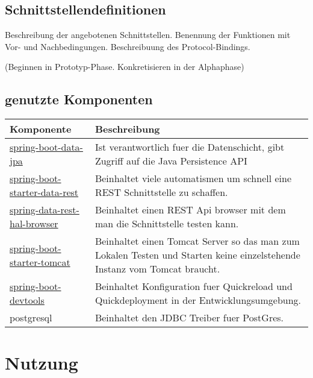 \subsection{Schnittstellendefinitionen}
Beschreibung der angebotenen Schnittstellen. Benennung der Funktionen
mit Vor- und Nachbedingungen. Beschreibuung des Protocol-Bindings.

(Beginnen in Prototyp-Phase. Konkretisieren in der Alphaphase)

\subsection{genutzte Komponenten}

\begin{table}[h]
\begin{tabular}{|l|p{4cm}|}
   \hline 
   Komponente & Beschreibung \\
   \hline
   \href{https://docs.spring.io/spring-data/jpa/docs/current/reference/html/}{spring-boot-data-jpa} &
    Ist verantwortlich fuer die Datenschicht, gibt Zugriff auf die Java Persistence API
   \\ \hline
   \href{https://docs.spring.io/spring-data/rest/docs/current/reference/html/}{spring-boot-starter-data-rest} &
   Beinhaltet viele automatismen um schnell eine REST Schnittstelle zu schaffen.
   \\ \hline
   \href{https://docs.spring.io/spring-data/rest/docs/current/reference/html/#_the_hal_browser}{spring-data-rest-hal-browser} &
   Beinhaltet einen REST Api browser mit dem man die Schnittstelle testen kann.
   \\ \hline
   \href{https://docs.spring.io/spring-boot/docs/current/reference/htmlsingle/#using-boot-starter}{spring-boot-starter-tomcat} &
   Beinhaltet einen Tomcat Server so das man zum Lokalen Testen und Starten keine einzelstehende Instanz
   vom Tomcat braucht.
   \\ \hline
   \href{https://docs.spring.io/spring-boot/docs/current/reference/html/using-boot-devtools.html}{spring-boot-devtools} &
   Beinhaltet Konfiguration fuer Quickreload und Quickdeployment in der Entwicklungsumgebung.
   \\ \hline
   postgresql &
   Beinhaltet den JDBC Treiber fuer PostGres.
   \\ \hline
\end{tabular}
\end{table}
\section{Nutzung}
